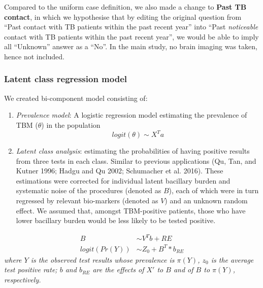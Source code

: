 \documentclass[
]{article}
\providecommand{\tightlist}{%
  \setlength{\itemsep}{0pt}\setlength{\parskip}{0pt}}
\begin{document}
Compared to the uniform case definition, we also made a change to \textbf{Past TB contact}, in which we hypothesise that by editing the original question from ``Past contact with TB patients within the past recent year'' into ``Past \emph{noticeable} contact with TB patients within the past recent year'', we would be able to imply all ``Unknown'' answer as a ``No''. In the main study, no brain imaging was taken, hence not included.

\hypertarget{latent-class-regression-model}{%
\subsubsection{Latent class regression model}\label{latent-class-regression-model}}

We created bi-component model consisting of:

\begin{enumerate}
\def\labelenumi{\arabic{enumi}.}
\tightlist
\item
  \emph{Prevalence model}: A logistic regression model estimating the prevalence of TBM (\(\theta\)) in the population
  \[
  logit(\theta) \sim X^Ta
    \]
\item
  \emph{Latent class analysis}: estimating the probabilities of having positive results from three tests in each class. Similar to previous applications (Qu, Tan, and Kutner 1996; Hadgu and Qu 2002; Schumacher et al. 2016). These estimations were corrected for individual latent bacillary burden and systematic noise of the procedures (denoted as \(B\)), each of which were in turn regressed by relevant bio-markers (denoted as \(V\)) and an unknown random effect. We assumed that, amongst TBM-positive patients, those who have lower bacillary burden would be less likely to be tested positive.
\end{enumerate}

\[
\begin{aligned}
  B &\sim V^Tb + RE\\
  logit(Pr(Y)) &\sim Z_0 + B^T * b_{RE}
\end{aligned}
\]
\emph{where \(Y\) is the observed test results whose prevalence is \(\pi(Y)\), \(z_0\) is the average test positive rate; \(b\) and \(b_{RE}\) are the effects of \(X'\) to \(B\) and of \(B\) to \(\pi(Y)\), respectively.}

\providecommand{\docline}[3]{\noalign{\global\setlength{\arrayrulewidth}{#1}}\arrayrulecolor[HTML]{#2}\cline{#3}}

\setlength{\tabcolsep}{2pt}
\end{document}

